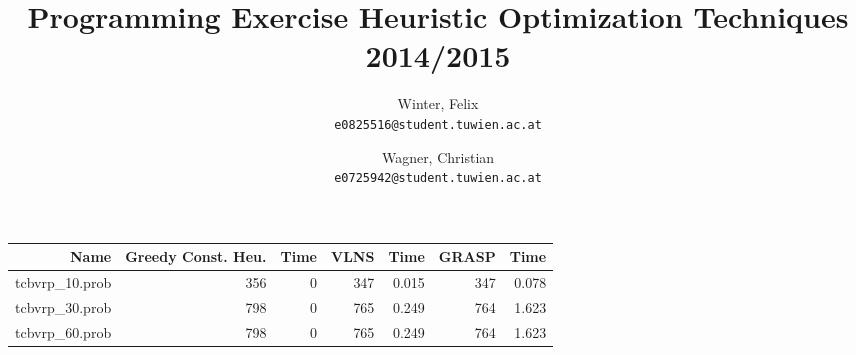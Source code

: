 \documentclass[a4paper]{scrartcl}
\author{
  Winter, Felix\\
  \texttt{e0825516@student.tuwien.ac.at}
  \and
  Wagner, Christian\\
  \texttt{e0725942@student.tuwien.ac.at}
}
\title{Programming Exercise Heuristic Optimization Techniques 2014/2015}
\begin{document}
\setlength{\abovedisplayskip}{0pt}
\setlength{\belowdisplayskip}{0pt}

\begingroup
 \makeatletter
 \maketitle
\endgroup


\begin{tabular}{r | r | r | r | r | r | r}
\hline
Name & Greedy Const. Heu. & Time & VLNS & Time & GRASP & Time \\
\hline \hline 
tcbvrp\_10.prob & 356 & 0 & 347 & 0.015 & 347 & 0.078 \\
\hline
tcbvrp\_30.prob & 798 & 0 & 765 & 0.249 & 764 & 1.623 \\
\hline
tcbvrp\_60.prob & 798 & 0 & 765 & 0.249 & 764 & 1.623 \\

\end{tabular}
\end{document}
